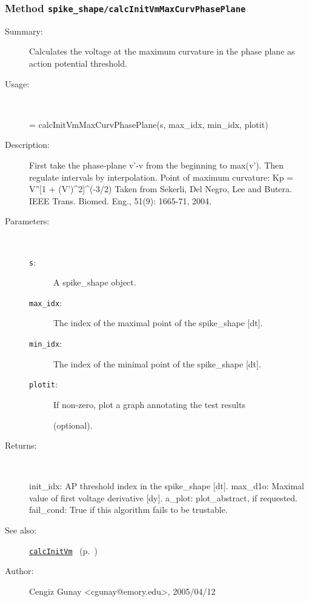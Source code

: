 \subsubsection[Method \texttt{calcInitVmMaxCurvPhasePlane}]{Method \texttt{spike\_shape/calcInitVmMaxCurvPhasePlane}}%
%
\label{ref_spike_shape__calcInitVmMaxCurvPhasePlane}%
\hypertarget{ref_spike_shape__calcInitVmMaxCurvPhasePlane}{}%
\begin{description}
\item[Summary:]Calculates the voltage at the maximum curvature in the phase plane as action potential threshold.
%
\item[Usage:]~%
\begin{lyxcode}%
[init\_idx, max\_d1o, a\_plot, fail\_cond] = 
	calcInitVmMaxCurvPhasePlane(s, max\_idx, min\_idx, plotit)
%
\end{lyxcode}%
%
\item[Description:]%
First take the phase-plane v'-v from the beginning to max(v'). Then regulate 
 intervals by interpolation. Point of maximum curvature: Kp = V''[1 + (V')\textasciicircum{}2]\textasciicircum{}(-3/2)
 Taken from Sekerli, Del Negro, Lee and Butera. 
 IEEE Trans. Biomed. Eng., 51(9): 1665-71, 2004.
\item[Parameters:]~
\begin{description}%
\item[\texttt{s}:]
 A spike\_shape object.
\item[\texttt{max\_idx}:]
 The index of the maximal point of the spike\_shape [dt].
\item[\texttt{min\_idx}:]
 The index of the minimal point of the spike\_shape [dt].
\item[\texttt{plotit}:]
 If non-zero, plot a graph annotating the test results 

(optional).
\end{description}%
%
\item[Returns:
]~

	init\_idx: AP threshold index in the spike\_shape [dt].
	max\_d1o: Maximal value of first voltage derivative [dy].
	a\_plot: plot\_abstract, if requested.
	fail\_cond: True if this algorithm fails to be trustable.
%
%
\item[See also:]%
\hyperlink{ref_calcInitVm}{\texttt{calcInitVm}}%
\ (p.~\pageref{ref_calcInitVm})%
%
%
\item[Author:]%
Cengiz Gunay <cgunay@emory.edu>, 2005/04/12
%
\end{description}
\methodline%
